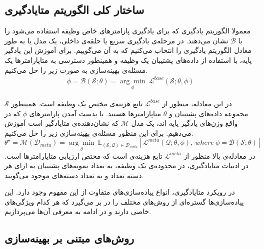 \subsection{ساختار کلی الگوریتم متایادگیری}

معمولا الگوریتم یادگیری که برای یادگیری پارامتر‌های خاص وظیفه استفاده می‌شود را با 
$\mathcal{B}$
نشان می‌دهند. در مرحله‌ی یادگیری سریع یا حلقه‌ی داخلی، یک مدل یا به طور معادل الگوریتم یادگیری را انتخاب می‌کنیم که به آن 
می‌گوییم. برای آموزش این یادگیر پایه، با استفاده از داده‌های پشتیبان یک وظیفه و همینطور دسترسی به متاپارامترها یک مسئله‌ی بهینه‌سازی به صورت زیر را حل می‌کنیم.
\begin{eqnarray}
	\phi = \mathcal{B}\left(\mathcal{S} ; \theta \right)=\underset{\phi}{\arg \min } \ \mathcal{L}^{{base}}\left(\mathcal{S} ; \theta, \phi\right)
\end{eqnarray} 

در این معادله، منظور از 
$\mathcal{L}^{base}$
تابع هزینه‌ی مختص یک وظیفه است. همینطور 
$\mathcal{S}$
مجموعه داده‌های پشتیبان و 
$\theta$
متاپارامترها هستند.
 با بدست آمدن پارامترهای 
  $\phi$
  که در واقع وزن‌های یادگیر پایه اند، یک مدل
  $\mathcal{M}$
  که نشان‌دهنده‌ی متایادگیر است آموزش می‌دهیم. برای این منظور مسئله‌ی بهینه‌سازی زیر را حل می‌کنیم.
    \begin{equation}
    	\theta^{\star} = \mathcal{M}(\mathcal{D}_{meta})= \underset{\theta}{\arg \min} \  \mathbb{E}_{(\mathcal{S}, \mathcal{Q})\in \mathcal{D}_{meta}}[\mathcal{L}^{{meta }}\left(\mathcal{Q}; \theta, \phi\right), \ where \ \phi=\mathcal{B}(\mathcal{S}; \theta)]
    \end{equation}
در معادله‌ی بالا منظور از 
$\mathcal{L}^{meta}$
تابع هزینه‌ی است که مختص ارزیابی متاپارامترها است. در ادبیات متایادگیری، در محدوده‌ی یک وظیفه، به تعداد نمونه‌های پشتیبان به ازای هر دسته تعداد 
و به تعداد دسته‌های موجود 
می‌گویند.


در رویکرد متایادگیری، انواع پیاده‌سازی‌های متفاوت از این مفهوم وجود دارد. این پیاده‌سازی‌ها گستره‌ای از روش‌های مختلف را در بر می‌گیرد که هر کدام ویژگی‌های خاصی دارند و در ادامه به معرفی آن‌ها می‌پردازیم.

\subsection{روش‌های مبتنی بر بهینه‌سازی}

